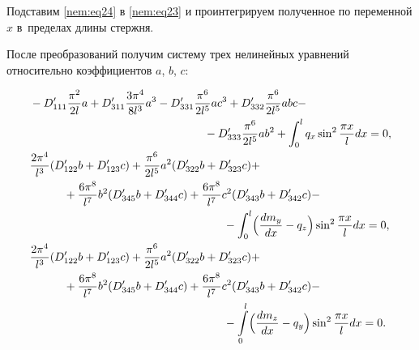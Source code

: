 Подставим \eqref{nem:eq24} в \eqref{nem:eq23} и проинтегрируем полученное по переменной $x$ в~пределах длины стержня. 

После преобразований получим систему трех нелинейных уравнений относительно коэффициентов $a$, $b$, $c$:





\begin{equation}\label{nem:eq25}

\begin{aligned}

&-D^\prime_{111}\frac{\pi^2}{2l}a+D^\prime_{311}\frac{3\pi^4}{8l^3}a^3-D^\prime_{331}\frac{\pi^6}{2l^5}ac^3+D^\prime_{332}\frac{\pi^6}{2l^5}abc- \\ 

&

\hspace{5.4cm}

-D^\prime_{333}\frac{\pi^6}{2l^5}ab^2+

\int _0^lq_x\sin^2 \frac{\pi x}{l}dx=0,

\\

&

\frac{2\pi^4}{l^3} (D^\prime_{122}b+D^\prime_{123}c )+

\frac{\pi^6}{2l^5}a^2 (D^\prime_{322}b+D^\prime_{323}c)+

\\

& \qquad \quad 

+ \frac{6\pi^8}{l^7}b^2 (D^\prime_{345}b+D^\prime_{344}c)+  

\frac{6\pi^8}{l^7}c^2 (D^\prime_{343}b+D^\prime_{342}c ) - 

\\

&

\hspace{6cm}

-\int _0^l\Bigl(\frac{dm_y}{dx}-q_z\Bigr)\sin^2 \frac{\pi x}{l}dx=0,

\\

&

\frac{2\pi^4}{l^3} (D^\prime_{122}b+D^\prime_{123}c )+

\frac{\pi^6}{2l^5}a^2 (D^\prime_{322}b+D^\prime_{323}c)+ \\

&

\qquad \quad 

+ 

\frac{6\pi^8}{l^7}b^2 (D^\prime_{345}b+D^\prime_{344}c )+

\frac{6\pi^8}{l^7}c^2(D^\prime_{343}b+D^\prime_{342}c ) -

\\

&

\hspace{6cm}

-\int\limits_0^l\Bigl(\frac{dm_z}{dx}-q_y\Bigr)\sin^2\frac{\pi x}{l} dx=0.

\end{aligned}

\end{equation}
